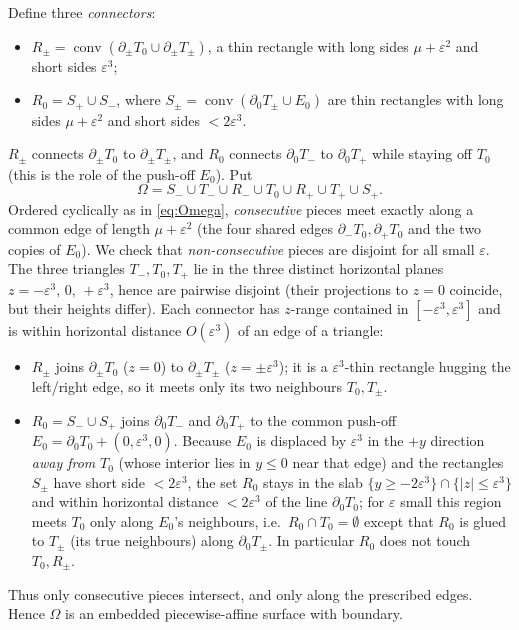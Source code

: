 \documentclass[12pt]{article}
\newcommand{\eps}{\varepsilon}
\begin{document}
Define three \emph{connectors}:
\begin{itemize}
\item $R_\pm=\operatorname{conv}(\partial_\pm T_0\cup\partial_\pm T_\pm)$,
a thin rectangle with long sides $\mu+\eps^2$ and short sides $\eps^3$;
\item $R_0=S_+\cup S_-$, where
$S_\pm=\operatorname{conv}(\partial_0T_\pm\cup E_0)$ are thin rectangles
with long sides $\mu+\eps^2$ and short sides $<2\eps^3$.
\end{itemize}
$R_\pm$ connects $\partial_\pm T_0$ to $\partial_\pm T_\pm$, and $R_0$
connects $\partial_0T_-$ to $\partial_0T_+$ while staying off $T_0$ (this
is the role of the push-off $E_0$). Put
\begin{equation}\label{eq:Omega}
\Omega=S_-\cup T_-\cup R_-\cup T_0\cup R_+\cup T_+\cup S_+.
\end{equation}
Ordered cyclically as in \eqref{eq:Omega}, \emph{consecutive} pieces meet
exactly along a common edge of length $\mu+\eps^2$ (the four shared edges
$\partial_- T_0,\partial_+T_0$ and the two copies of $E_0$). We check that
\emph{non-consecutive} pieces are disjoint for all small $\eps$. The three
triangles $T_-,T_0,T_+$ lie in the three distinct horizontal planes
$z=-\eps^3,\,0,\,+\eps^3$, hence are pairwise disjoint (their projections
to $z=0$ coincide, but their heights differ). Each connector has $z$-range
contained in $[-\eps^3,\eps^3]$ and is within horizontal distance
$O(\eps^3)$ of an edge of a triangle:
\begin{itemize}
\item $R_\pm$ joins $\partial_\pm T_0$ ($z=0$) to $\partial_\pm T_\pm$
($z=\pm\eps^3$); it is a $\eps^3$-thin rectangle hugging the
left/right edge, so it meets only its two neighbours $T_0,T_\pm$.
\item $R_0=S_-\cup S_+$ joins $\partial_0T_-$ and $\partial_0T_+$ to the
common push-off $E_0=\partial_0T_0+(0,\eps^3,0)$. Because $E_0$ is
displaced by $\eps^3$ in the $+y$ direction \emph{away from} $T_0$ (whose
interior lies in $y\le 0$ near that edge) and the rectangles $S_\pm$ have
short side $<2\eps^3$, the set $R_0$ stays in the slab
$\{y\ge -2\eps^3\}\cap\{|z|\le\eps^3\}$ and within horizontal distance
$<2\eps^3$ of the line $\partial_0T_0$; for $\eps$ small this region meets
$T_0$ only along $E_0$'s neighbours, i.e.\ $R_0\cap T_0=\emptyset$ except
that $R_0$ is glued to $T_\pm$ (its true neighbours) along
$\partial_0T_\pm$. In particular $R_0$ does not touch $T_0,R_\pm$.
\end{itemize}
Thus only consecutive pieces intersect, and only along the prescribed
edges. Hence $\Omega$ is an embedded piecewise-affine surface with
boundary.
\end{document}
